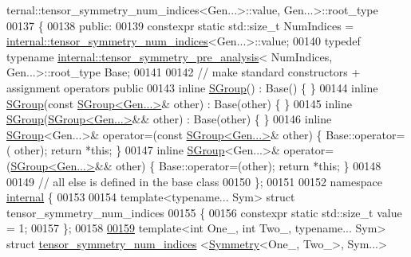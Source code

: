 \begin{DoxyCode}
      ternal::tensor\_symmetry\_num\_indices<Gen...>::value, Gen...>::root\_type
00137 \{
00138   \textcolor{keyword}{public}:
00139     constexpr \textcolor{keyword}{static} std::size\_t NumIndices = 
      \hyperlink{struct_eigen_1_1internal_1_1tensor__symmetry__num__indices}{internal::tensor\_symmetry\_num\_indices}<Gen...>::value;
00140     \textcolor{keyword}{typedef} \textcolor{keyword}{typename} \hyperlink{struct_eigen_1_1internal_1_1tensor__symmetry__pre__analysis}{internal::tensor\_symmetry\_pre\_analysis}<
      NumIndices, Gen...>::root\_type Base;
00141 
00142     \textcolor{comment}{// make standard constructors + assignment operators public}
00143     \textcolor{keyword}{inline} \hyperlink{class_eigen_1_1_s_group}{SGroup}() : Base() \{ \}
00144     \textcolor{keyword}{inline} \hyperlink{class_eigen_1_1_s_group}{SGroup}(\textcolor{keyword}{const} \hyperlink{class_eigen_1_1_s_group}{SGroup<Gen...>}& other) : Base(other) \{ \}
00145     \textcolor{keyword}{inline} \hyperlink{class_eigen_1_1_s_group}{SGroup}(\hyperlink{class_eigen_1_1_s_group}{SGroup<Gen...>}&& other) : Base(other) \{ \}
00146     \textcolor{keyword}{inline} \hyperlink{class_eigen_1_1_s_group}{SGroup}<Gen...>& operator=(\textcolor{keyword}{const} \hyperlink{class_eigen_1_1_s_group}{SGroup<Gen...>}& other) \{ Base::operator=(
      other); \textcolor{keywordflow}{return} *\textcolor{keyword}{this}; \}
00147     \textcolor{keyword}{inline} \hyperlink{class_eigen_1_1_s_group}{SGroup}<Gen...>& operator=(\hyperlink{class_eigen_1_1_s_group}{SGroup<Gen...>}&& other) \{ Base::operator=(other); \textcolor{keywordflow}{
      return} *\textcolor{keyword}{this}; \}
00148 
00149     \textcolor{comment}{// all else is defined in the base class}
00150 \};
00151 
00152 \textcolor{keyword}{namespace }\hyperlink{namespaceinternal}{internal} \{
00153 
00154 \textcolor{keyword}{template}<\textcolor{keyword}{typename}... Sym> \textcolor{keyword}{struct }tensor\_symmetry\_num\_indices
00155 \{
00156   constexpr \textcolor{keyword}{static} std::size\_t value = 1;
00157 \};
00158 
\hyperlink{struct_eigen_1_1internal_1_1tensor__symmetry__num__indices_3_01_symmetry_3_01_one___00_01_two___01_4_00_01_sym_8_8_8_01_4}{00159} \textcolor{keyword}{template}<\textcolor{keywordtype}{int} One\_, \textcolor{keywordtype}{int} Two\_, \textcolor{keyword}{typename}... Sym> \textcolor{keyword}{struct }\hyperlink{struct_eigen_1_1internal_1_1tensor__symmetry__num__indices}{tensor\_symmetry\_num\_indices}
      <\hyperlink{struct_eigen_1_1_symmetry}{Symmetry}<One\_, Two\_>, Sym...>

\end{DoxyCode}
